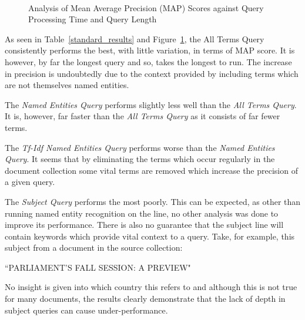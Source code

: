 \documentclass{l4proj}
\begin{document}
\begin{figure}[H]
\centering
\begin{subfigure}[t]{.5\textwidth}
\centering
{}
\end{subfigure}%
~
\begin{subfigure}[t]{.5\textwidth}
\centering
{}
\end{subfigure}
\caption{Analysis of Mean Average Precision (MAP) Scores against Query Processing Time and Query Length} \label{mapgraphs}
\end{figure}

As seen in Table~\ref{standard_results} and Figure~\ref{mapgraphs}, the All Terms Query consistently performs the best, with little variation, in terms of MAP score. It is however, by far the longest query and so, takes the longest to run. The increase in precision is undoubtedly due to the context provided by including terms which are not themselves named entities.

The \textit{Named Entities Query} performs slightly less well than the \textit{All Terms Query}. It is, however, far faster than the \textit{All Terms Query} as it consists of far fewer terms.

The \textit{Tf-Idf Named Entities Query} performs worse than the \textit{Named Entities Query}. It seems that by eliminating the terms which occur regularly in the document collection some vital terms are removed which increase the precision of a given query.

The \textit{Subject Query} performs the most poorly. This can be expected, as other than running named entity recognition on the line, no other analysis was done to improve its performance. There is also no guarantee that the subject line will contain keywords which provide vital context to a query.
Take, for example, this subject from a document in the source collection:
\begin{center}``PARLIAMENT'S FALL SESSION: A PREVIEW"\end{center}
No insight is given into which country this refers to and although this is not true for many documents, the results clearly demonstrate that the lack of depth in subject queries can cause under-performance.
\end{document}
